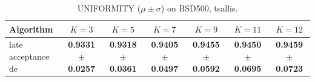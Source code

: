 \begin{table}[htbp]
\centering
\caption{UNIFORMITY ($\mu \pm \sigma$) on BSD500, tsallis.}
\label{tab:exp1-tsallis-uniformity}
\begin{tabular}{lcccccc}
\toprule
Algorithm & $K=3$ & $K=5$ & $K=7$ & $K=9$ & $K=11$ & $K=12$ \\
\midrule
late acceptance de & \textbf{0.9331 $\pm$ 0.0257} & \textbf{0.9318 $\pm$ 0.0361} & \textbf{0.9405 $\pm$ 0.0497} & \textbf{0.9455 $\pm$ 0.0592} & \textbf{0.9450 $\pm$ 0.0695} & \textbf{0.9459 $\pm$ 0.0723} \\
\bottomrule
\end{tabular}
\end{table}